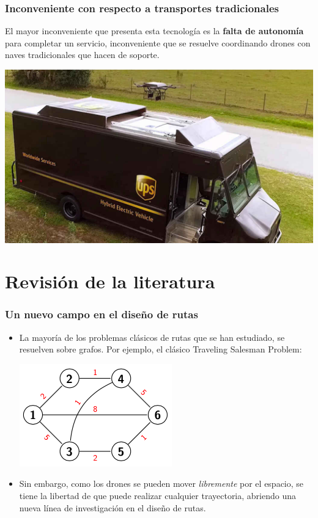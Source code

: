 \documentclass[slidestop,usepdftitle=false, xcolor=table]{beamer}
\begin{document}
	\begin{frame}
		\frametitle{Inconveniente con respecto a transportes tradicionales}
		El mayor inconveniente que presenta esta tecnología es la \textbf{falta de autonomía} para completar un servicio, inconveniente que se resuelve coordinando drones con naves tradicionales que hacen de soporte.
		\begin{center}
			\includegraphics[width=0.8\linewidth]{dron_camion}
		\end{center}
	\end{frame}

	\section{Revisión de la literatura}
	\begin{frame}
		\frametitle{Un nuevo campo en el diseño de rutas}
		\begin{itemize}
		\item La mayoría de los problemas clásicos de rutas que se han estudiado, se resuelven sobre grafos. Por ejemplo, el clásico Traveling Salesman Problem:
		\begin{center}
			\includegraphics[width=0.4\linewidth]{TSP}
		\end{center}
		\pause
		\item Sin embargo, como los drones se pueden mover \textit{libremente} por el espacio, se tiene la libertad de que puede realizar cualquier trayectoria, abriendo una nueva línea de investigación en el diseño de rutas.
		\end{itemize}
	\end{frame}
\end{document}
